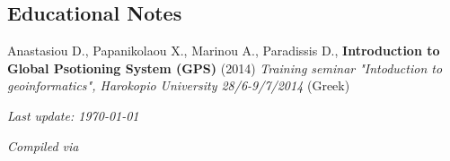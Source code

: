 \documentclass[a4paper]{Classes/cv_prof_en} %
\begin{document}
\subsection*{Educational Notes}
\renewcommand*{\labelenumi}{N\theenumi.}
\begin{etaremune}
\item Anastasiou D., Papanikolaou X., Marinou A., Paradissis D., \textbf{Introduction to Global Psotioning System (GPS)} (2014) \textit{Training seminar "Intoduction to geoinformatics", Harokopio University 28/6-9/7/2014} (Greek)
\end{etaremune}


\vfill
\hfill \textit{Last update: \today}\par
\hfill \textit{Compiled via \XeLaTeX}
\end{document}
